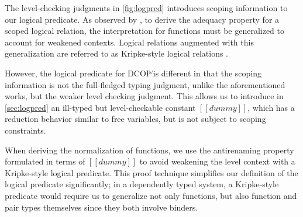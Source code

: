 \documentclass[acmsmall, screen=true, nonacm=true,
  review=\ifpublic false\else true\fi,
  anonymous=\ifanonymous true\else false\fi
]{acmart}
\makeatletter
\DeclarePairedDelimiter{\bracks}{\llbracket}{\rrbracket}
\newcommand{\name}{\texorpdfstring{DCOI$^{\omega}$\@\xspace}{DCOI-omega}}
\newcommand{\interp}[4]{\bracks{#1 \vDash_{#2} #3} \searrow #4}
\makeatother
\begin{document}
The level-checking judgments in \cref{fig:logpred} introduces scoping information to our
logical predicate. As observed by \citet{abel:normalization}, to
derive the adequacy property for a scoped logical relation, the
interpretation for functions must be generalized to account for
weakened contexts. Logical relations augmented with this
generalization are referred to as Kripke-style logical relations
\citep{abel:poplmark, abel:irrelevance, adjedj:mltt-coq, harper:equivalence}.

However, the logical predicate for \name is different in that the
scoping information is not the full-fledged typing judgment, unlike
the aforementioned works, but the weaker level checking judgment. This
allows us to introduce in \cref{sec:logpred} an ill-typed but
level-checkable constant $[[dummy]]$, which has a reduction behavior similar
to free variables, but is not subject to scoping constraints.

When deriving the normalization of functions, we use the antirenaming
property formulated in terms of $[[dummy]]$ to avoid weakening the level
context with a Kripke-style logical predicate. This proof technique
simplifies our definition of the logical predicate significantly; in a
dependently typed system, a Kripke-style predicate would require us to
generalize not only functions, but also function and pair types themselves
since they both involve binders.
\fi

\end{document}
